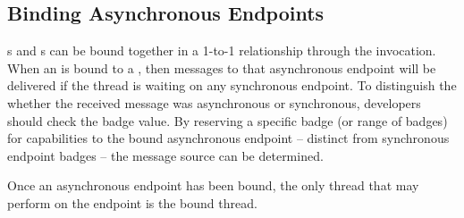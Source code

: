 \subsection{Binding Asynchronous Endpoints}
\label{sec:asyncep-binding}

s and s can be bound together in a 1-to-1 relationship
through the  invocation. When an
 is bound to a , then messages to that asynchronous
endpoint will be delivered if the thread is waiting on any synchronous
endpoint. To distinguish the whether the received message was asynchronous
or synchronous, developers should check the badge value. By reserving a
specific badge (or range of badges) for capabilities to the bound
asynchronous endpoint -- distinct from synchronous endpoint badges -- the
message source can be determined.

Once an asynchronous endpoint has been bound, the only thread that may perform
 on the endpoint is the bound thread.
